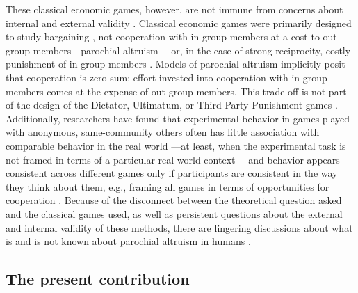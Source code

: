\documentclass[bibauthoryear]{aa}
\begin{document}
These classical economic games, however, are not immune from concerns about internal and external validity \citep{Pisor2020, Naar2020}. Classical economic games were primarily designed to study bargaining \citep{Camerer1995}, not cooperation with in-group members at a cost to out-group members---parochial altruism \citep[e.g.,][]{yamagishi2016parochial}---or, in the case of strong reciprocity, costly punishment of in-group members \citep{hagen2006game, guala2012reciprocity}. Models of parochial altruism implicitly posit that cooperation is zero-sum: effort invested into cooperation with in-group members comes at the expense of out-group members. This trade-off is not part of the design of the Dictator, Ultimatum, or Third-Party Punishment games \citep[see][for relevant discussion]{Gil-white2004}. Additionally, researchers have found that experimental behavior in games played with anonymous, same-community others often has little association with comparable behavior in the real world \citep{gurven2008collective, winking2013natural}---at least, when the experimental task is not framed in terms of a particular real-world context \citep{cronk2007influence, hagen2006game, lesorogol2005experiments, lesorogol2007bringing, pisor2012importing, lightner2017}---and behavior appears consistent across different games only if participants are consistent in the way they think about them, e.g., framing all games in terms of opportunities for cooperation \citep{yamagishi2013behavioral}. Because of the disconnect between the theoretical question asked and the classical games used, as well as persistent questions about the external and internal validity of these methods, there are lingering discussions about what is and is not known about parochial altruism in humans \citep{Rusch2014,yamagishi2016parochial}.

\subsection{The present contribution}
\end{document}

